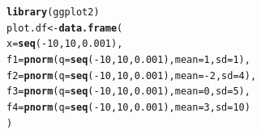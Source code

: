 \documentclass{article}\usepackage[]{graphicx}\usepackage[]{color}
\makeatletter
\newcommand{\hlnum}[1]{\textcolor[rgb]{0.686,0.059,0.569}{#1}}%
\newcommand{\hlopt}[1]{\textcolor[rgb]{0,0,0}{#1}}%
\newcommand{\hlstd}[1]{\textcolor[rgb]{0.345,0.345,0.345}{#1}}%
\newcommand{\hlkwb}[1]{\textcolor[rgb]{0.69,0.353,0.396}{#1}}%
\newcommand{\hlkwc}[1]{\textcolor[rgb]{0.333,0.667,0.333}{#1}}%
\newcommand{\hlkwd}[1]{\textcolor[rgb]{0.737,0.353,0.396}{\textbf{#1}}}%
\newenvironment{kframe}{%
 \def\at@end@of@kframe{}%
 \ifinner\ifhmode%
  \def\at@end@of@kframe{\end{minipage}}%
  \begin{minipage}{\columnwidth}%
 \fi\fi%
 \def\FrameCommand##1{\hskip\@totalleftmargin \hskip-\fboxsep
 \colorbox{shadecolor}{##1}\hskip-\fboxsep
     \hskip-\linewidth \hskip-\@totalleftmargin \hskip\columnwidth}%
 \MakeFramed {\advance\hsize-\width
   \@totalleftmargin\z@ \linewidth\hsize
   \@setminipage}}%
 {\par\unskip\endMakeFramed%
 \at@end@of@kframe}
\newenvironment{knitrout}{}{} %
\makeatother
\begin{document}
\begin{enumerate}
\begin{enumerate}
\begin{figure}[H]
\begin{center}
\begin{knitrout}
\color{fgcolor}\begin{kframe}
\begin{alltt}
\hlkwd{library}\hlstd{(ggplot2)}
\hlstd{plot.df} \hlkwb{<-} \hlkwd{data.frame}\hlstd{(}
  \hlkwc{x}\hlstd{=}\hlkwd{seq}\hlstd{(}\hlopt{-}\hlnum{10}\hlstd{,} \hlnum{10}\hlstd{,} \hlnum{0.001}\hlstd{),}
  \hlkwc{f1}\hlstd{=}\hlkwd{pnorm}\hlstd{(}\hlkwc{q}\hlstd{=}\hlkwd{seq}\hlstd{(}\hlopt{-}\hlnum{10}\hlstd{,} \hlnum{10}\hlstd{,} \hlnum{0.001}\hlstd{),} \hlkwc{mean}\hlstd{=}\hlnum{1}\hlstd{,} \hlkwc{sd}\hlstd{=}\hlnum{1}\hlstd{),}
  \hlkwc{f2}\hlstd{=}\hlkwd{pnorm}\hlstd{(}\hlkwc{q}\hlstd{=}\hlkwd{seq}\hlstd{(}\hlopt{-}\hlnum{10}\hlstd{,} \hlnum{10}\hlstd{,} \hlnum{0.001}\hlstd{),} \hlkwc{mean}\hlstd{=}\hlopt{-}\hlnum{2}\hlstd{,} \hlkwc{sd}\hlstd{=}\hlnum{4}\hlstd{),}
  \hlkwc{f3}\hlstd{=}\hlkwd{pnorm}\hlstd{(}\hlkwc{q}\hlstd{=}\hlkwd{seq}\hlstd{(}\hlopt{-}\hlnum{10}\hlstd{,} \hlnum{10}\hlstd{,} \hlnum{0.001}\hlstd{),} \hlkwc{mean}\hlstd{=}\hlnum{0}\hlstd{,} \hlkwc{sd}\hlstd{=}\hlnum{5}\hlstd{),}
  \hlkwc{f4}\hlstd{=}\hlkwd{pnorm}\hlstd{(}\hlkwc{q}\hlstd{=}\hlkwd{seq}\hlstd{(}\hlopt{-}\hlnum{10}\hlstd{,} \hlnum{10}\hlstd{,} \hlnum{0.001}\hlstd{),} \hlkwc{mean}\hlstd{=}\hlnum{3}\hlstd{,} \hlkwc{sd}\hlstd{=}\hlnum{10}\hlstd{)}
\hlstd{)}


\end{alltt}
\end{kframe}
\end{knitrout}
\end{center}
\end{figure}
\end{enumerate}
\end{enumerate}
\end{document}
